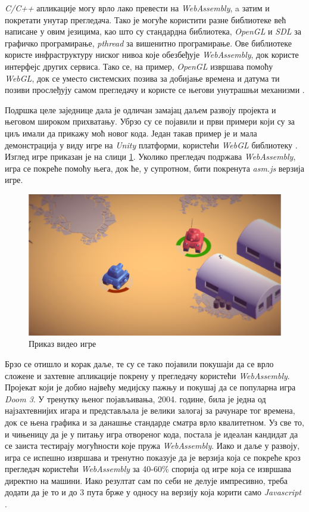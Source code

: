 \documentclass[12pt,oneside]{memoir}
\begin{document}
\textit{C/C++} апликације могу врло лако превести на \textit{WebAssembly}, a затим и покретати унутар прегледача.
Тако је  могуће користити разне библиотеке већ написане у овим језицима, као што су стандардна библиотека, \textit{OpenGL} и
\textit{SDL} за графичко програмирање, \textit{pthread} за вишенитно програмирање. Ове библиотеке користе инфраструктуру ниског
нивоа које обезбеђује \textit{WebAssembly}, док користе интерфејс других сервиса. Тако се, на пример, \textit{OpenGL} извршава помоћу
\textit{WebGL}, док се уместо системских позива за добијање времена и датума ти позиви прослеђују самом прегледачу и користе се његови
унутрашњи механизми \cite{WASMC++}.

Подршка целе заједнице дала је одличан замајац даљем развоју пројекта и његовом широком прихватању. Убрзо су се појавили и први примери
који су за циљ имали да прикажу моћ новог кода. Један такав пример је и мала демонстрација у виду игре на \textit{Unity} платформи, користећи \textit{WebGL}
библиотеку \cite{GAME}. Изглед игре приказан је на слици \ref{img:TANKS}. Уколико прегледач подржава \textit{WebAssembly}, игра се покреће помоћу њега, док ће,
у супротном, бити покренута \textit{asm.js} верзија игре.

\begin{figure}
\begin{center}
\includegraphics[scale=0.2]{tanks_demo}
\caption{Приказ видео игре}
\label{img:TANKS}
\end{center}
\end{figure}

Брзо се отишло и корак даље, те су се тако појавили покушаји да се врло сложене и захтевне апликације покрену у прегледачу користећи \textit{WebAssembly}.
Пројекат који је добио највећу медијску пажњу и покушај да се популарна игра \textit{Doom 3}. У тренутку њеног појављивања, 2004. године, била је једна од најзахтевнијих
игара и представљала је велики залогај за рачунаре тог времена, док се њена графика и за данашње стандарде сматра врло квалитетном. Уз све то, и чињеницу да је у питању игра
отвореног кода, постала је идеалан кандидат да се заиста тестирају могућности које пружа \textit{WebAssembly}. Иако и даље у развоју, игра се испешно извршава и тренутно
показује да је верзија која се покреће кроз прегледач користећи \textit{WebAssembly} за 40-60\% спорија од игре која се извршава директно на машини. Иако резултат сам
по себи не делује импресивно, треба додати да је то и до 3 пута брже у односу на верзију која корити само \textit{Javascript} \cite{D3WASM}.
\end{document}
